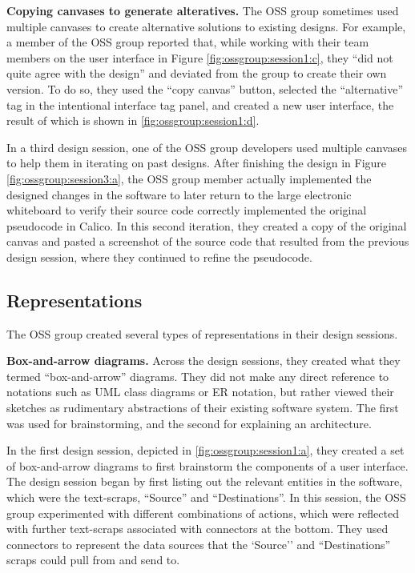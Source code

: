 \textbf{Copying canvases to generate alteratives. } The OSS group sometimes used multiple canvases to create alternative solutions to existing designs. For example, a member of the OSS group reported that, while working with their team members on the user interface in Figure \ref{fig:ossgroup:session1:c}, they ``did not quite agree with the design'' and deviated from the group to create their own version. To do so, they used the ``copy canvas'' button, selected the ``alternative'' tag in the intentional interface tag panel, and created a new user interface, the result of which is shown in  \ref{fig:ossgroup:session1:d}. 

In a third design session, one of the OSS group developers used multiple canvases to help them in iterating on past designs. After finishing the design in Figure \ref{fig:ossgroup:session3:a}, the OSS group member actually implemented the designed changes in the software to later return to the large electronic whiteboard to verify their source code correctly implemented the original pseudocode in Calico. In this second iteration, they created a copy of the original canvas and pasted a screenshot of the source code that resulted from the previous design session, where they continued to refine the pseudocode.

\subsection{Representations}

The OSS group created several types of representations in their design sessions.

\textbf{Box-and-arrow diagrams. } Across the design sessions, they created what they termed ``box-and-arrow'' diagrams. They did not make any direct reference to notations such as UML class diagrams or ER notation, but rather viewed their sketches as rudimentary abstractions of their existing software system. The first was used for brainstorming, and the second for explaining an architecture.

In the first design session, depicted in \ref{fig:ossgroup:session1:a}, they created a set of box-and-arrow diagrams to first brainstorm the components of a user interface. The design session began by first listing out the relevant entities in the software, which were the text-scraps, ``Source'' and ``Destinations''. In this session, the OSS group experimented with different combinations of actions, which were reflected with further text-scraps associated with connectors at the bottom. They used connectors to represent the data sources that the `Source'' and ``Destinations'' scraps could pull from and send to.

